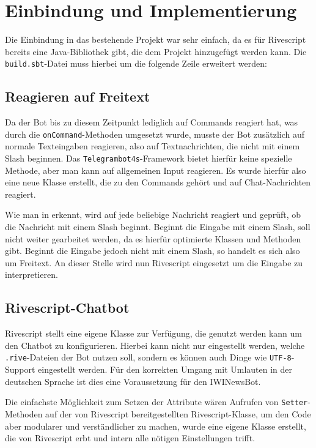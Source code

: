 \section{Einbindung und Implementierung}
Die Einbindung in das bestehende Projekt war sehr einfach, da es für Rivescript bereits eine Java-Bibliothek gibt, die dem Projekt hinzugefügt werden kann. Die \texttt{build.sbt}-Datei muss hierbei um die folgende Zeile erweitert werden:


\subsection{Reagieren auf Freitext}
Da der Bot bis zu diesem Zeitpunkt lediglich auf Commands reagiert hat, was durch die \texttt{onCommand}-Methoden umgesetzt wurde, musste der Bot zusätzlich auf normale Texteingaben reagieren, also auf Textnachrichten, die nicht mit einem Slash beginnen. Das \texttt{Telegrambot4s}-Framework bietet hierfür keine spezielle Methode, aber man kann auf allgemeinen Input reagieren.
Es wurde hierfür also eine neue Klasse erstellt, die zu den Commands gehört und auf Chat-Nachrichten reagiert.


Wie man in  erkennt, wird auf jede beliebige Nachricht reagiert und geprüft, ob die Nachricht mit einem Slash beginnt. Beginnt die Eingabe mit einem Slash, soll nicht weiter gearbeitet werden, da es hierfür optimierte Klassen und Methoden gibt. Beginnt die Eingabe jedoch nicht mit einem Slash, so handelt es sich also um Freitext. An dieser Stelle wird nun Rivescript eingesetzt um die Eingabe zu interpretieren.

\subsection{Rivescript-Chatbot}
Rivescript stellt eine eigene Klasse zur Verfügung, die genutzt werden kann um den Chatbot zu konfigurieren. Hierbei kann nicht nur eingestellt werden, welche \texttt{.rive}-Dateien der Bot nutzen soll, sondern es können auch Dinge wie \texttt{UTF-8}-Support eingestellt werden. Für den korrekten Umgang mit Umlauten in der deutschen Sprache ist dies eine Voraussetzung für den IWINewsBot.

Die einfachste Möglichkeit zum Setzen der Attribute wären Aufrufen von \texttt{Setter}-Methoden auf der von Rivescript bereitgestellten Rivescript-Klasse, um den Code aber modularer und verständlicher  zu machen, wurde eine eigene Klasse erstellt, die von Rivescript erbt und intern alle nötigen Einstellungen trifft. \newpage


